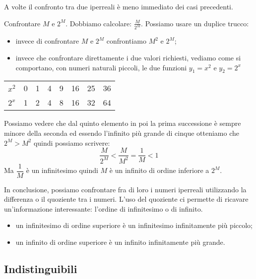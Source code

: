 \vspace{1em}
A volte il confronto tra due iperreali è meno immediato dei casi precedenti.
\begin{esempio}
 Confrontare \(M\) e \(2^M\). 
 Dobbiamo calcolare: \(\frac{M}{2^M}\). 
Possiamo usare un duplice trucco: 
\begin{itemize} [nosep]
 \item invece di confrontare \(M\) e \(2^M\) confrontiamo \(M^2\) e \(2^M\);
 \item invece che confrontare direttamente i due valori richiesti, vediamo 
come si comportano, con numeri naturali piccoli, le due funzioni 
\(y_1=x^2\) e \(y_2=2^x\)
\end{itemize}
\begin{center}
\begin{tabular}{cccccccc}
\(x^2\) & 0 & 1 & 4 & 9 & 16 & 25 & 36\\
\(2^x\) & 1 & 2 & 4 & 8 & 16 & 32 & 64
\end{tabular}
\end{center}
Possiamo vedere che dal quinto elemento in poi la prima successione è sempre
minore della seconda ed essendo l'infinito più grande di cinque 
otteniamo che \(2^M > M^2\) quindi possiamo scrivere:
\[\frac{M}{2^M} < \frac{M}{M^2} = \frac{1}{M} < 1\]
Ma \(\dfrac{1}{M}\) è un infinitesimo quindi \(M\) è un infinito di ordine 
inferiore a \(2^M\).
\end{esempio}

In conclusione, possiamo confrontare fra di loro i numeri iperreali 
utilizzando la differenza o il quoziente tra i numeri. L'uso del quoziente 
ci permette di ricavare un'informazione interessante: l'ordine di 
infinitesimo o di infinito.
\begin{itemize} [noitemsep]
 \item un infinitesimo di ordine superiore è un infinitesimo infinitamente 
 più piccolo;
 \item un infinito di ordine superiore è un infinito infinitamente più 
grande.
\end{itemize}

\subsection{Indistinguibili}
\label{subsec:insnum_indistinguibili}

